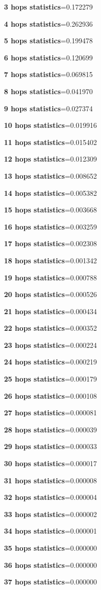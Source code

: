 \documentclass[a4paper]{article}
\begin{document}
\textbf{3 hops statistics}=0.172279

\textbf{4 hops statistics}=0.262936

\textbf{5 hops statistics}=0.199478

\textbf{6 hops statistics}=0.120699

\textbf{7 hops statistics}=0.069815

\textbf{8 hops statistics}=0.041970

\textbf{9 hops statistics}=0.027374

\textbf{10 hops statistics}=0.019916

\textbf{11 hops statistics}=0.015402

\textbf{12 hops statistics}=0.012309

\textbf{13 hops statistics}=0.008652

\textbf{14 hops statistics}=0.005382

\textbf{15 hops statistics}=0.003668

\textbf{16 hops statistics}=0.003259

\textbf{17 hops statistics}=0.002308

\textbf{18 hops statistics}=0.001342

\textbf{19 hops statistics}=0.000788

\textbf{20 hops statistics}=0.000526

\textbf{21 hops statistics}=0.000434

\textbf{22 hops statistics}=0.000352

\textbf{23 hops statistics}=0.000224

\textbf{24 hops statistics}=0.000219

\textbf{25 hops statistics}=0.000179

\textbf{26 hops statistics}=0.000108

\textbf{27 hops statistics}=0.000081

\textbf{28 hops statistics}=0.000039

\textbf{29 hops statistics}=0.000033

\textbf{30 hops statistics}=0.000017

\textbf{31 hops statistics}=0.000008

\textbf{32 hops statistics}=0.000004

\textbf{33 hops statistics}=0.000002

\textbf{34 hops statistics}=0.000001

\textbf{35 hops statistics}=0.000000

\textbf{36 hops statistics}=0.000000

\textbf{37 hops statistics}=0.000000
\end{document}
